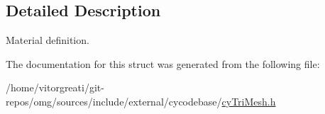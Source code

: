 \subsection{Detailed Description}
Material definition. 

The documentation for this struct was generated from the following file\+:\begin{DoxyCompactItemize}
\item 
/home/vitorgreati/git-\/repos/omg/sources/include/external/cycodebase/\mbox{\hyperlink{cy_tri_mesh_8h}{cy\+Tri\+Mesh.\+h}}\end{DoxyCompactItemize}
